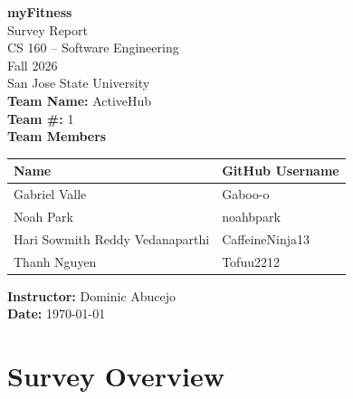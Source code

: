 \documentclass[11pt]{article}
\begin{document}

\begin{titlepage}
    \centering

    \vspace*{1.5in}

    {\Huge \textbf{myFitness}}\\[0.5cm]
    {\Large Survey Report}\\[1.5cm]

    {\large CS 160 -- Software Engineering}\\
    {\large Fall 2026}\\
    {\large San Jose State University}\\[1.5cm]

    \textbf{Team Name:} ActiveHub\\
    \textbf{Team \#:} 1\\[1.5cm]

    \textbf{Team Members}\\[0.5cm]

    \begin{tabular}{ll}
        \toprule
        Name & GitHub Username \\
        \midrule
        Gabriel Valle & Gaboo-o \\
        Noah Park & noahbpark \\
        Hari Sowmith Reddy Vedanaparthi & CaffeineNinja13 \\
        Thanh Nguyen & Tofuu2212 \\
        \bottomrule
    \end{tabular}

    \vfill

    \textbf{Instructor:} Dominic Abucejo\\
    \textbf{Date:} \today

\end{titlepage}


\tableofcontents
\newpage


\section{Survey Overview}
\end{document}

